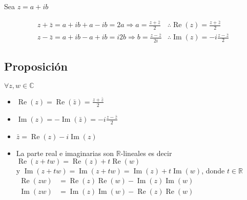 Sea $z=a+i b$

\[
 \begin{aligned}
  z+\bar{z}=a+i b+a-i b=2 a \Rightarrow a=\frac{z+\bar{z}}{2} & \therefore \operatorname{Re}(z)=\frac{z+\bar{z}}{2} \\
  z-\bar{z}=a+i b-a+i b=i 2 b \Rightarrow b=\frac{z-\bar{z}}{2 i} & \therefore \operatorname{Im}(z)=-i \frac{z-\bar{z}}{2}
 \end{aligned}
\]

\subsection{Proposición}
$\forall z, w \in \mathbb{C}$
\begin{itemize}
  \item $\operatorname{Re}(z)=\operatorname{Re}(\bar{z})=\frac{z+\bar{z}}{2}$ 
  \item $\operatorname{Im}(z)=-\operatorname{Im}(\bar{z})=-i \frac{z-\bar{z}}{2}$ 
  \item $\bar{z}=\operatorname{Re}(z)-i \operatorname{Im}(z)$ 
  \item La parte real e imaginarias son $\mathbb{R}$-lineales es decir $\operatorname{Re}(z+tw)=\operatorname{Re}(z)+t \operatorname{Re}(w)$\\
  y $\operatorname{Im}(z+t w)=\operatorname{Im}(z+t w)=\operatorname{Im}(z)+t \operatorname{Im}(w)$, donde  $t \in \mathbb{R}$\\
  $\begin{aligned}
       \operatorname{Re}(z w)&=\operatorname{Re}(z) \operatorname{Re}(w)-\operatorname{Im}(z) \operatorname{Im}(w) \\
       \operatorname{Im}(z w)&=\operatorname{Im}(z)\operatorname{Im}(w)-\operatorname{Re}(z) \operatorname{Re}(w)
   \end{aligned}$
\end{itemize}

